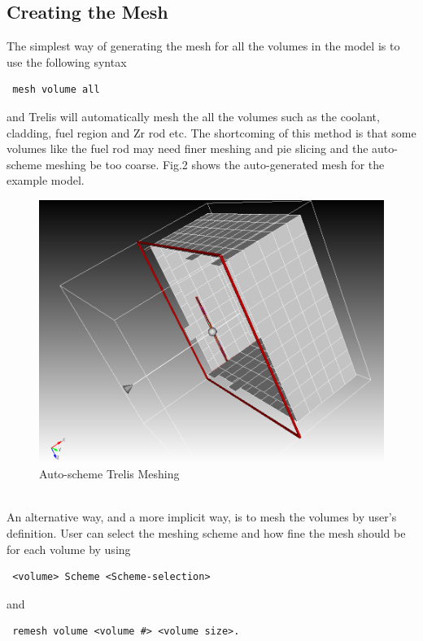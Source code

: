 \documentclass[a4paper]{article}
\begin{document}
\subsection{Creating the Mesh}
The simplest way of generating the mesh for all the volumes in the model is to use the following syntax
\begin{lstlisting}
 mesh volume all
\end{lstlisting}
and Trelis will automatically mesh the all the volumes such as the coolant, cladding, fuel region and Zr rod etc. The shortcoming 
of this method is that some volumes like the fuel rod may need finer meshing and pie slicing and the auto-scheme meshing be too coarse. Fig.2 shows the auto-generated mesh
for the example model.
\begin{figure}[th!]
\centering
\includegraphics[width=.6\textwidth]{fig2}
\caption{Auto-scheme Trelis Meshing}
\end{figure}\\
An alternative way, and a more implicit way, is to mesh the volumes by user's definition. User can select the meshing scheme and how fine the mesh should be for each volume by using
\begin{lstlisting}
 <volume> Scheme <Scheme-selection>
\end{lstlisting}
and
\begin{lstlisting}
 remesh volume <volume #> <volume size>.
\end{lstlisting}
\end{document}
